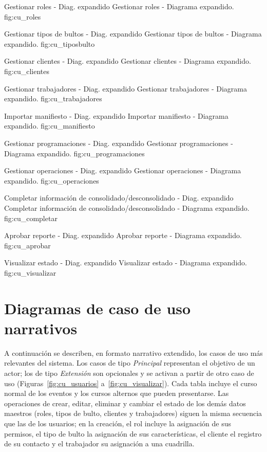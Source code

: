 {Gestionar roles - Diag. expandido}
{Gestionar roles - Diagrama expandido.}
{fig:cu_roles}

{Gestionar tipos de bultos - Diag. expandido}
{Gestionar tipos de bultos - Diagrama expandido.}
{fig:cu_tiposbulto}

{Gestionar clientes - Diag. expandido}
{Gestionar clientes - Diagrama expandido.}
{fig:cu_clientes}

{Gestionar trabajadores - Diag. expandido}
{Gestionar trabajadores - Diagrama expandido.}
{fig:cu_trabajadores}

{Importar manifiesto - Diag. expandido}
{Importar manifiesto - Diagrama expandido.}
{fig:cu_manifiesto}

{Gestionar programaciones - Diag. expandido}
{Gestionar programaciones - Diagrama expandido.}
{fig:cu_programaciones}

{Gestionar operaciones - Diag. expandido}
{Gestionar operaciones - Diagrama expandido.}
{fig:cu_operaciones}

{Completar información de consolidado/desconsolidado - Diag. expandido}
{Completar información de consolidado/desconsolidado - Diagrama expandido.}
{fig:cu_completar}

{Aprobar reporte - Diag. expandido}
{Aprobar reporte - Diagrama expandido.}
{fig:cu_aprobar}

{Visualizar estado - Diag. expandido}
{Visualizar estado - Diagrama expandido.}
{fig:cu_visualizar}

\section{Diagramas de caso de uso narrativos}
\label{sec:cu_narrativos}

A continuación se describen, en formato narrativo extendido, los casos de uso más relevantes del
sistema. Los casos de tipo \textit{Principal} representan el objetivo de un actor; los de tipo
\textit{Extensión} son opcionales y se activan a partir de otro caso de uso
(Figuras~\ref{fig:cu_usuarios} a~\ref{fig:cu_visualizar}). Cada tabla incluye el curso normal de
los eventos y los cursos alternos que pueden presentarse. Las operaciones de crear, editar,
eliminar y cambiar el estado de los demás datos maestros (roles, tipos de bulto, clientes y
trabajadores) siguen la misma secuencia que las de los usuarios; en la creación, el rol incluye la
asignación de sus permisos, el tipo de bulto la asignación de sus características, el cliente el
registro de su contacto y el trabajador su asignación a una cuadrilla.

